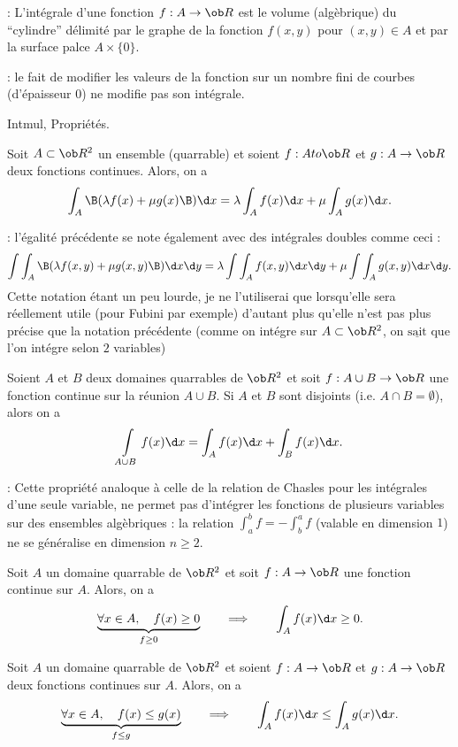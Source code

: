  : L'int\'egrale d'une fonction $f:A\to\ob R$ est le volume (alg\`ebrique) du ``cylindre'' d\'elimit\'e par le graphe de la fonction $f(x,y)$ pour $(x,y)\in A$
et par la surface palce $A\times\{0\}$. 
\bigskip

\Remarque : le fait de modifier les valeurs de la fonction sur un nombre fini de courbes (d'\'epaisseur $0$) ne modifie pas son int\'egrale. 
\bigskip


\Section Intmul, Propri\'et\'es. 

\Propriete [Title=Lin\'earit\'e de l'int\'egrale]
Soit $A\subset\ob R^2$ un ensemble (quarrable) et soient $f:A to\ob R$ et $g:A\to\ob R$ deux fonctions continues. Alors, on a 
$$
\int_A\B(\lambda f(x)+\mu g(x)\B)\d x=\lambda\int_Af(x)\d x+\mu\int_Ag(x)\d x.
$$
 
\Remarque : l'\'egalit\'e pr\'ec\'edente se note \'egalement avec des int\'egrales doubles comme ceci : 
$$
\int\int_A\B(\lambda f(x,y)+\mu g(x,y)\B)\d x\d y=\lambda\int\int_Af(x,y)\d x\d y+\mu\int\int_Ag(x,y)\d x\d y.
$$
Cette notation \'etant un peu lourde, je ne l'utiliserai que lorsqu'elle sera r\'eellement utile (pour Fubini par exemple) d'autant plus qu'elle n'est pas plus pr\'ecise que la notation pr\'ec\'edente (comme on int\'egre sur $A\subset\ob R^2$, on $\underline{\mbox{sait}}$ que l'on int\'egre selon $2$ variables)
\bigskip

\Propriete [Title=Additivit\'e par rapport au domaine d'int\'egration] 
Soient $A$ et $B$ deux domaines quarrables de $\ob R^2$ et soit $f:A\cup B\to\ob R$ une fonction continue 
sur la r\'eunion $A\cup B$. Si $A$ et $B$ sont disjoints (i.e. $A\cap B=\emptyset$), alors on a 
$$
\int\limits_{A\cup B}f(x)\d x=\int_Af(x)\d x+\int_Bf(x)\d x. 
$$

\Remarque : Cette propri\'et\'e analoque \`a celle de la relation de Chasles pour les int\'egrales d'une seule variable, ne permet pas d'int\'egrer les fonctions de plusieurs variables sur des ensembles alg\`ebriques : la relation $\int_a^bf=-\int_b^af$ (valable en dimension $1$) ne se g\'en\'eralise en dimension $n\ge2$. 
\bigskip

\Propriete[Title=positivit\'e de l'int\'egrale] Soit $A$ un domaine quarrable de $\ob R^2$ et soit $f: A\to\ob R$ une fonction continue sur $A$. Alors, on a 
$$
\underbrace{
\forall x\in A,\quad f(x)\ge0}_{f\ge0}\qquad\Longrightarrow\qquad \int_Af(x)\d x\ge0.
$$ 


\Propriete[Title=Croissance de l'int\'egrale]Soit $A$ un domaine quarrable de $\ob R^2$ et soient $f: A\to\ob R$ et $g:A\to\ob R$ deux fonctions continues sur $A$. 
Alors, on a 
$$
\underbrace{
\forall x\in A,\quad f(x)\le g(x)}_{f\le g}\qquad\Longrightarrow\qquad \int_Af(x)\d x\le \int_Ag(x)\d x.
$$ 


